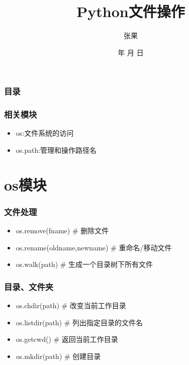 \documentclass[13pt]{beamer}
\begin{document}
\title{Python文件操作}


\author{张果}


\renewcommand{\today}{\number\year 年 \number\month 月 \number\day 日}
\date{\today}


\subject{Talks}




\begin{frame}
\titlepage
\end{frame}

\begin{frame}
\frametitle{目录}
\tableofcontents
\end{frame}


\begin{frame}
\frametitle{相关模块}
\begin{itemize}
  \item<1-> os:文件系统的访问
  \item<2-> os.path:管理和操作路径名
\end{itemize}

\end{frame}

\section{os模块}

\begin{frame}
\frametitle{文件处理}
\begin{itemize}
  \item<1-> os.remove(fname)  \# 删除文件
  \item<2-> os.rename(oldname,newname)  \# 重命名/移动文件
  \item<3-> os.walk(path) \# 生成一个目录树下所有文件
\end{itemize}
\end{frame}

\begin{frame}
\frametitle{目录、文件夹}
\begin{itemize}
  \item<1-> os.chdir(path)  \# 改变当前工作目录
  \item<2-> os.listdir(path)  \# 列出指定目录的文件名
  \item<3-> os.getcwd() \# 返回当前工作目录
  \item<4-> os.mkdir(path) \# 创建目录
\end{itemize}
\end{frame}
\end{document}
